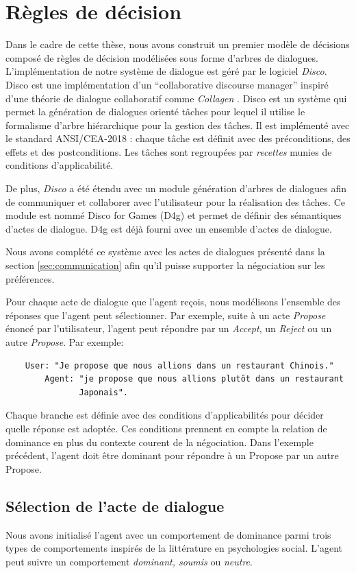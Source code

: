 	\section{Règles de décision}
	Dans le cadre de cette thèse, nous avons construit un premier modèle de décisions composé de règles de décision modélisées sous forme d'arbres de dialogues. L'implémentation de notre système de dialogue est géré par le logiciel \emph{Disco}. Disco est une implémentation d'un ``collaborative discourse manager'' inspiré d'une théorie de dialogue collaboratif comme \emph{Collagen} \cite{rich1997collagen}. Disco est un système qui permet la génération de dialogues orienté tâches pour lequel il utilise le formalisme d'arbre hiérarchique pour la gestion des tâches. Il est implémenté avec le standard ANSI/CEA-2018 : chaque tâche est définit avec des préconditions, des effets et des postconditions. Les tâches sont regroupées par \emph{recettes} munies de conditions d'applicabilité.
	
	De plus, \emph{Disco} a été étendu avec un module génération d'arbres de dialogues afin de communiquer et collaborer avec l'utilisateur pour la réalisation des tâches. Ce module est nommé Disco for Games (D4g) et permet de définir des sémantiques d'actes de dialogue. D4g est déjà fourni avec un ensemble d'actes de dialogue.
	
	Nous avons complété ce système avec les actes de dialogues présenté dans la section \ref{sec:communication} afin qu'il puisse supporter la négociation sur les préférences.
	
	Pour chaque acte de dialogue que l'agent reçois, nous modélisons l'ensemble des réponses que l'agent peut sélectionner. Par exemple, suite à un acte \emph{Propose} énoncé par l'utilisateur, l'agent peut répondre par un \emph{Accept}, un \emph{Reject} ou un autre \emph{Propose}. 
	Par exemple:
	\begin{verbatim}
	User: "Je propose que nous allions dans un restaurant Chinois." 
		Agent: "je propose que nous allions plutôt dans un restaurant
			   Japonais". 
	\end{verbatim}
	Chaque branche est définie avec des conditions d'applicabilités pour décider quelle réponse est adoptée. 
	Ces conditions prennent en compte la relation de  dominance en plus du contexte courent de la négociation. Dans l'exemple précédent, l'agent doit être dominant pour répondre à un Propose par un autre Propose. 
	
	
	\subsection{Sélection de l'acte de dialogue}
	Nous avons initialisé l'agent avec un comportement de dominance parmi trois types de comportements inspirés de la littérature en psychologies social.  L'agent peut suivre un comportement \emph{dominant, soumis} ou \emph{neutre}. 
	
